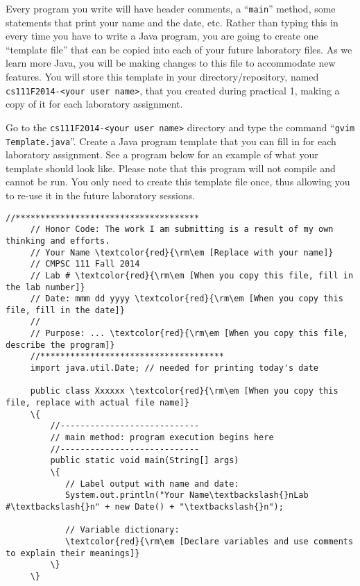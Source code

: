 Every program you write will have header comments, a ``{\tt main}'' method, some statements that print your name and the
date, etc. Rather than typing this in every time you have to write a Java program, you are going to create one
``template file'' that can be copied into each of your future laboratory files. As we learn more Java, you will be
making changes to this file to accommodate new features. You will store this template in your directory/repository,
named {\tt cs111F2014-<your user name>}, that you created during practical 1, making a copy of it for each laboratory
assignment.

\begin{sloppypar}
Go to the {\tt cs111F2014-<your user name>} directory and type the command ``{\tt gvim Template.java}''.  Create a Java
program template that you can fill in for each laboratory assignment.  See a program below for an example of what your
template should look like.  Please note that this program will not compile and cannot be run.  You only need to create
this template file once, thus allowing you to re-use it in the future laboratory sessions.
\end{sloppypar}

\newpage
\begin{Verbatim}[commandchars=\\\{\}]
     //*************************************
     // Honor Code: The work I am submitting is a result of my own thinking and efforts.
     // Your Name \textcolor{red}{\rm\em [Replace with your name]}
     // CMPSC 111 Fall 2014
     // Lab # \textcolor{red}{\rm\em [When you copy this file, fill in the lab number]}
     // Date: mmm dd yyyy \textcolor{red}{\rm\em [When you copy this file, fill in the date]}
     //
     // Purpose: ... \textcolor{red}{\rm\em [When you copy this file, describe the program]}
     //*************************************     
     import java.util.Date; // needed for printing today's date
     
     public class Xxxxxx \textcolor{red}{\rm\em [When you copy this file, replace with actual file name]}
     \{
         //----------------------------
         // main method: program execution begins here
         //----------------------------
         public static void main(String[] args)
         \{
            // Label output with name and date:
            System.out.println("Your Name\textbackslash{}nLab #\textbackslash{}n" + new Date() + "\textbackslash{}n");
     
            // Variable dictionary:
            \textcolor{red}{\rm\em [Declare variables and use comments to explain their meanings]}    
         \}
     \}
\end{Verbatim}

